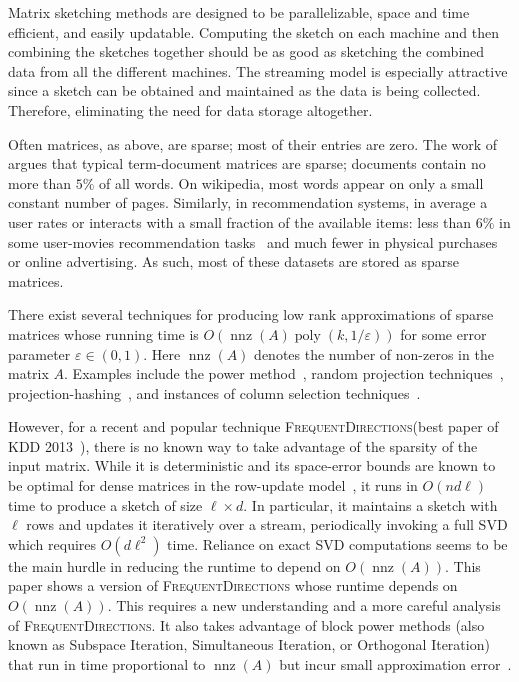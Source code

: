 \documentclass[11pt]{article}
\newcommand{\nnz}{\operatorname{nnz}}
\newcommand{\poly}{\operatorname{poly}}
\newcommand{\eps}{\varepsilon}
\newcommand{\fd}{\textsc{FrequentDirections}\xspace}
\begin{document}
Matrix sketching methods are designed to be parallelizable, space and time efficient, and easily updatable.  
Computing the sketch on each machine and then combining the sketches together should be as good as sketching the combined data from all the different machines.
The streaming model is especially attractive since a sketch can be obtained and maintained as the data is being collected.
Therefore, eliminating the need for data storage altogether.

Often matrices, as above, are sparse;  most of their entries are zero. 
The work of \cite{dhillon2001concept} argues that typical term-document matrices are sparse; documents contain no more than $5\%$ of all words.  
On wikipedia, most words appear on only a small constant number of pages.    
Similarly, in recommendation systems, in average a user rates or interacts with a small fraction of the available items:  
less than $6\%$ in some user-movies recommendation tasks~\cite{asendorfalgorithms} and much fewer in physical purchases or online advertising.
As such, most of these datasets are stored as sparse matrices.  


There exist several techniques for producing low rank approximations of sparse matrices whose running time is 
$O(\nnz(A) \poly(k,1/\eps))$ for some error parameter $\eps \in (0,1)$. 
Here $\nnz(A)$ denotes the number of non-zeros in the matrix $A$.
Examples include the power method~\cite{golub2012matrix}, random projection techniques~\cite{sarlos2006improved}, projection-hashing~\cite{clarkson2013low}, and instances of column selection techniques~\cite{drineas2006fast2}. 

However, for a recent and popular technique \fd (best paper of KDD 2013~\cite{liberty2013simple}), 
there is no known way to take advantage of the sparsity of the input matrix.  
While it is deterministic and its space-error bounds are known to be optimal for dense matrices in the row-update model~\cite{ghashami2015frequent}, it runs in $O(nd \ell)$ time to produce a sketch of size $\ell \times d$.  
In particular, it maintains a sketch with $\ell$ rows and updates it iteratively over a stream, periodically invoking a full SVD which requires $O(d \ell^2)$ time.  
Reliance on exact SVD computations seems to be the main hurdle in reducing the runtime to depend on $O(\nnz(A))$.  
This paper shows a version of \fd whose runtime depends on $O(\nnz(A))$. This requires a new understanding and a more careful analysis of \fd.  
It also takes advantage of block power methods (also known as Subspace Iteration, Simultaneous Iteration, or Orthogonal Iteration) that run in time proportional to $\nnz(A)$ but incur small approximation error~\cite{musco2015stronger}.  
\end{document}
